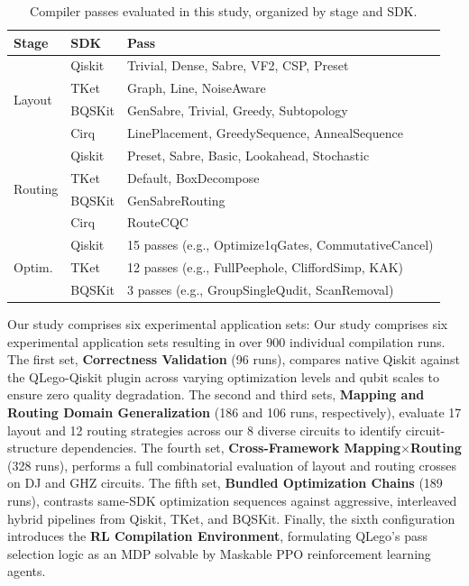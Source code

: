 \documentclass[conference]{IEEEtran}
\begin{document}
\begin{table}[t]
\centering
\caption{Compiler passes evaluated in this study, organized by stage and SDK.}
\label{tab:passes}
\begin{tabular}{lll}
\hline
\textbf{Stage} & \textbf{SDK} & \textbf{Pass} \\
\hline
\multirow{4}{*}{Layout} & Qiskit & Trivial, Dense, Sabre, VF2, CSP, Preset \\
 & TKet & Graph, Line, NoiseAware \\
 & BQSKit & GenSabre, Trivial, Greedy, Subtopology \\
 & Cirq & LinePlacement, GreedySequence, AnnealSequence \\
\hline
\multirow{4}{*}{Routing} & Qiskit & Preset, Sabre, Basic, Lookahead, Stochastic \\
 & TKet & Default, BoxDecompose \\
 & BQSKit & GenSabreRouting \\
 & Cirq & RouteCQC \\
\hline
\multirow{3}{*}{Optim.} & Qiskit & 15 passes (e.g., Optimize1qGates, CommutativeCancel) \\
 & TKet & 12 passes (e.g., FullPeephole, CliffordSimp, KAK) \\
 & BQSKit & 3 passes (e.g., GroupSingleQudit, ScanRemoval) \\
\hline
\end{tabular}
\end{table}

Our study comprises six experimental application sets:
Our study comprises six experimental application sets resulting in over 900 individual compilation runs. The first set, \textbf{Correctness Validation} (96 runs), compares native Qiskit against the QLego-Qiskit plugin across varying optimization levels and qubit scales to ensure zero quality degradation. The second and third sets, \textbf{Mapping and Routing Domain Generalization} (186 and 106 runs, respectively), evaluate 17 layout and 12 routing strategies across our 8 diverse circuits to identify circuit-structure dependencies. The fourth set, \textbf{Cross-Framework Mapping$\times$Routing} (328 runs), performs a full combinatorial evaluation of layout and routing crosses on DJ and GHZ circuits. The fifth set, \textbf{Bundled Optimization Chains} (189 runs), contrasts same-SDK optimization sequences against aggressive, interleaved hybrid pipelines from Qiskit, TKet, and BQSKit. Finally, the sixth configuration introduces the \textbf{RL Compilation Environment}, formulating QLego's pass selection logic as an MDP solvable by Maskable PPO reinforcement learning agents.
\end{document}

